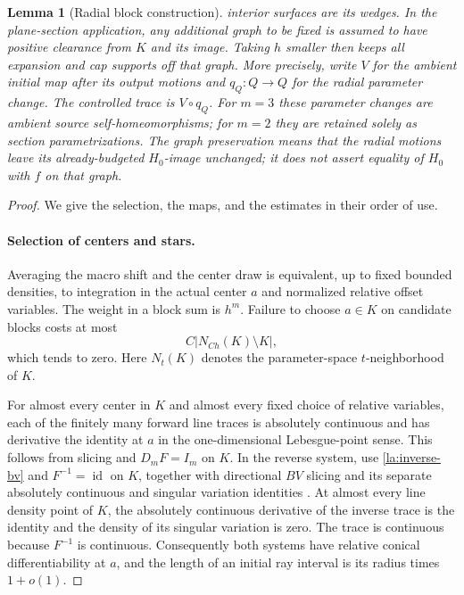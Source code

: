 \documentclass[11pt]{article}
\numberwithin{equation}{section}
\newtheorem{lemma}[theorem]{Lemma}
\theoremstyle{definition}
\theoremstyle{remark}
\begin{document}
\begin{lemma}[Radial block construction]
interior surfaces are its wedges.  In the plane-section application,
any additional graph to be fixed is assumed to have positive
clearance from $K$ and its image.  Taking $h$ smaller then keeps all
expansion and cap supports off that graph.  More precisely, write
$V$ for the ambient initial map after its output motions and
$q_Q:Q\to Q$ for the radial parameter change.  The controlled trace
is $V\circ q_Q$.  For $m=3$ these parameter changes are ambient
source self-homeomorphisms; for $m=2$ they are retained solely as
section parametrizations.  The graph preservation means that the
radial motions leave its already-budgeted $H_0$-image unchanged;
it does not assert equality of $H_0$ with $f$ on that graph.
\end{lemma}

\begin{proof}
We give the selection, the maps, and the estimates in their order of
use.

\paragraph{Selection of centers and stars.}
Averaging the macro shift and the center draw is equivalent, up to
fixed bounded densities, to integration in the actual center $a$ and
normalized relative offset variables.  The weight in a block sum is
$h^m$.  Failure to choose $a\in K$ on candidate blocks costs at most
\[
 C\bigl|N_{Ch}(K)\setminus K\bigr|,
\]
which tends to zero.  Here $N_t(K)$ denotes the parameter-space
$t$-neighborhood of $K$.

For almost every center in $K$ and almost every fixed choice of
relative variables, each of the finitely many forward line traces is
absolutely continuous and has derivative the identity at $a$ in the
one-dimensional Lebesgue-point sense.  This follows from slicing and
$D_mF=I_m$ on $K$.  In the reverse system, use
\eqref{la:inverse-bv} and $F^{-1}=\operatorname{id}$ on $K$, together with directional
$BV$ slicing and its separate absolutely continuous and singular
variation identities
\cite[Section~3.11, Theorems~3.103, 3.107, and~3.108]{AmbrosioFuscoPallara2000}.
At almost every line
density point of $K$, the absolutely continuous derivative of the
inverse trace is the identity and the density of its singular
variation is zero.  The trace is continuous because $F^{-1}$ is
continuous.  Consequently both systems have relative conical
differentiability at $a$, and the length of an initial ray interval is
its radius times $1+o(1)$.


\end{proof}
\end{document}

